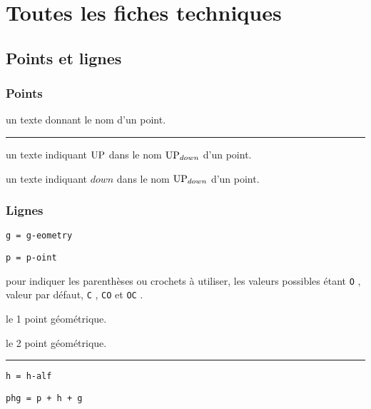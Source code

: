 \documentclass[12pt,a4paper]{article}
\theoremstyle{definition}
\newcommand\separation{
	\medskip
	\hfill\rule{0.5\textwidth}{0.75pt}\hfill
	\medskip
}
\newcommand\extraspace{
	\vspace{0.25em}
}
\newcommand\mwhyprefix[2]{%
	\texttt{#1 = #1-#2}%
}
\newcommand\prefix[1]{%
	\texttt{#1}%
}
\begin{document}
\newpage
\section{Toutes les fiches techniques} \label{techincal-ids}






\subsection{Points et lignes}

\subsubsection{Points}




\IDarg{} un texte donnant le nom d'un point.


\separation



 un texte indiquant $\pt{UP}$ dans le nom $\pt*{UP}{down}$ d'un point.

 un texte indiquant $down$ dans le nom $\pt*{UP}{down}$ d'un point.




\subsubsection{Lignes}



  \hfill \mwhyprefix{g}{eometry}

  \hfill \mwhyprefix{p}{oint}

\IDoption{} pour indiquer les parenthèses ou crochets à utiliser, les valeurs possibles étant \prefix{O}, valeur par défaut, \prefix{C}, \prefix{CO} et \prefix{OC}.

 le 1\ier{} point géométrique.

 le 2\ieme{} point géométrique.


\separation


  \hfill \mwhyprefix{h}{alf}

  \hfill \prefix{phg = p + h + g}

\extraspace

\end{document}
